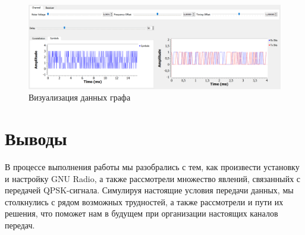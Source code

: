 \documentclass[a4paper,12pt]{report}
\begin{document}
 \begin{figure}[H]
        \centering
        \includegraphics[width=1.0\textwidth]{28.png}
        \caption{Визуализация данных графа}
        \label{fig:lab12_fig7_2}
\end{figure}

\chapter{Выводы}

В процессе выполнения работы мы разобрались с тем, как произвести установку и настройку GNU Radio, а также рассмотрели множество явлений, связанныйх с передачей QPSK-сигнала. Симулируя настоящие условия передачи данных, мы столкнулись с рядом возможных трудностей, а также рассмотрели и пути их решения, что поможет нам в будущем при организации настоящих каналов передач.
\end{document}
